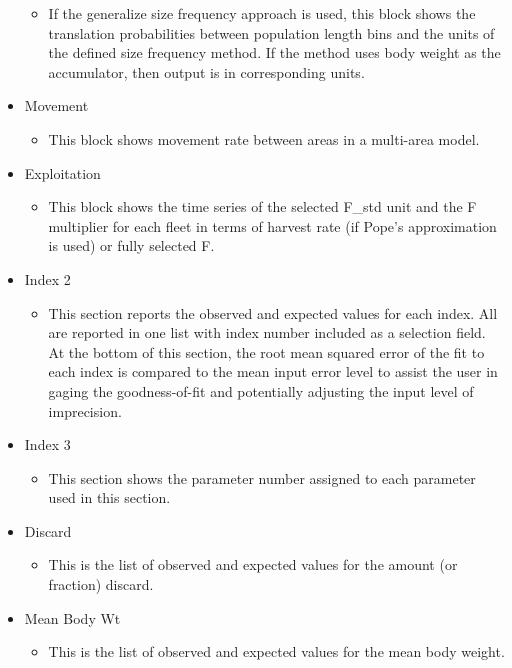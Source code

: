 \begin{itemize}
	\begin{itemize}
		\item If the generalize size frequency approach is used, this block shows the translation probabilities between population length bins and the units of the defined size frequency method.  If the method uses body weight as the accumulator, then output is in corresponding units.
	\end{itemize}
	\item Movement
	\begin{itemize}
		\item This block shows movement rate between areas in a multi-area model.
	\end{itemize}
	\item Exploitation
	\begin{itemize}
		\item This block shows the time series of the selected F\_std unit and the F multiplier for each fleet in terms of harvest rate (if Pope’s approximation is used) or fully selected F.
	\end{itemize}
	\item Index 2
	\begin{itemize}
		\item This section reports the observed and expected values for each index.  All are reported in one list with index number included as a selection field.  At the bottom of this section, the root mean squared error of the fit to each index is compared to the mean input error level to assist the user in gaging the goodness-of-fit and potentially adjusting the input level of imprecision.
	\end{itemize}
	\item Index 3
	\begin{itemize}
		\item This section shows the parameter number assigned to each parameter used in this section.
	\end{itemize}
	\item Discard
	\begin{itemize}
		\item This is the list of observed and expected values for the amount (or fraction) discard.
	\end{itemize}
	\item Mean Body Wt
	\begin{itemize}
		\item This is the list of observed and expected values for the mean body weight.
	\end{itemize}

\end{itemize}
